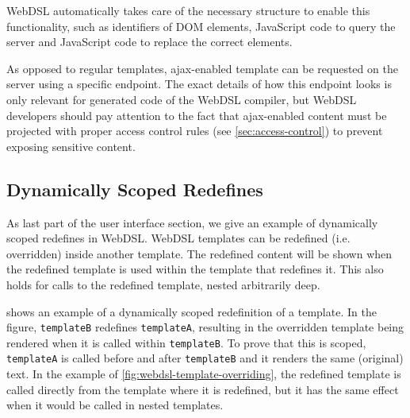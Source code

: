       WebDSL automatically takes care of the necessary structure to enable this functionality, such as identifiers of DOM elements, JavaScript code to query the server and JavaScript code to replace the correct elements.

      As opposed to regular templates, ajax-enabled template can be requested on the server using a specific endpoint. The exact details of how this endpoint looks is only relevant for generated code of the WebDSL compiler, but WebDSL developers should pay attention to the fact that ajax-enabled content must be projected with proper access control rules (see \cref{sec:access-control}) to prevent exposing sensitive content.

    \subsection{\label{subsec:redefines}Dynamically Scoped Redefines}

      As last part of the user interface section, we give an example of dynamically scoped redefines in WebDSL. WebDSL templates can be redefined (i.e. overridden) inside another template. The redefined content will be shown when the redefined template is used within the template that redefines it. This also holds for calls to the redefined template, nested arbitrarily deep.

       shows an example of a dynamically scoped redefinition of a template. In the figure, \texttt{templateB} redefines \texttt{templateA}, resulting in the overridden template being rendered when it is called within \texttt{templateB}. To prove that this is scoped, \texttt{templateA} is called before and after \texttt{templateB} and it renders the same (original) text. In the example of \cref{fig:webdsl-template-overriding}, the redefined template is called directly from the template where it is redefined, but it has the same effect when it would be called in nested templates.

